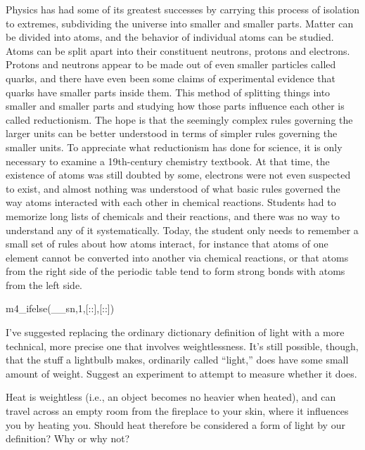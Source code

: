 Physics has had some of its greatest successes by carrying
this process of isolation to extremes, subdividing the
universe into smaller and smaller parts. Matter can be
divided into atoms, and the behavior of individual atoms can
be studied. Atoms can be split apart into their constituent
neutrons, protons and electrons. Protons and neutrons appear
to be made out of even smaller particles called quarks, and
there have even been some claims of experimental evidence
that quarks have smaller parts inside them. This method of
splitting things into smaller and smaller parts and studying
how those parts influence each other is called reductionism.
The hope is that the seemingly complex rules governing the
larger units can be better understood in terms of simpler
rules governing the smaller units. To appreciate what
reductionism has done for science, it is only necessary to
examine a 19th-century chemistry textbook. At that time, the
existence of atoms was still doubted by some, electrons were
not even suspected to exist, and almost nothing was
understood of what basic rules governed the way atoms
interacted with each other in chemical reactions. Students
had to memorize long lists of chemicals and their reactions,
and there was no way to understand any of it systematically.
Today, the student only needs to remember a small set of
rules about how atoms interact, for instance that atoms of
one element cannot be converted into another via chemical
reactions, or that atoms from the right side of the periodic
table tend to form strong bonds with atoms from the left side.

m4_ifelse(__sn,1,[::],[:\enlargethispage{-2\baselineskip}:])

\startdqs

\begin{dq}
I've suggested replacing the ordinary dictionary
definition of light with a more technical, more precise one
that involves weightlessness. It's still possible, though,
that the stuff a lightbulb makes, ordinarily called
``light,'' does have some small amount of weight. Suggest an
experiment to attempt to measure whether it does.
\end{dq}

\begin{dq}
Heat is weightless (i.e., an object becomes no heavier
when heated), and can travel across an empty room from the
fireplace to your skin, where it influences you by heating
you. Should heat therefore be considered a form of light by
our definition? Why or why not?
\end{dq}

